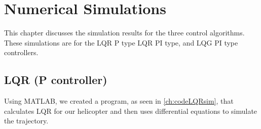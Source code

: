 \chapter{Numerical Simulations}
\label{ch: Chapter4}
This chapter discusses the simulation results for the three control algorithms.  These simulations are for the LQR P type LQR PI type, and LQG PI type controllers.
\section{LQR (P controller)}
Using MATLAB, we created a program, as seen in \ref{ch:codeLQRsim}, that calculates LQR for our helicopter and then uses differential equations to simulate the trajectory. 
